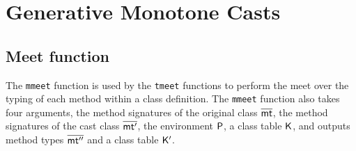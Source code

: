 \documentclass[a4paper,USenglish]{tex/lipics-v2016}
\begin{document}


\normalsize

\section{Generative Monotone Casts}

\subsection{Meet function}

The \texttt{mmeet} function is used by the \texttt{tmeet} functions to
perform the meet over the typing of each method within a class definition.
The \texttt{mmeet} function also takes four arguments, the method
signatures of the original class $\b\mt$, the method signatures of the cast
class $\b\mtp$, the environment $\P$, a class table $\K$, and outputs method
types $\b\mtpp$ and a class table $\Kp$. 


\opdef{
  $\mmeet{\b\mt}{\b\mtp}\P\K = \b\mtpp\,\Kp$
}{
}
\begin{mathpar}






\end{mathpar}
\\
\end{document}
